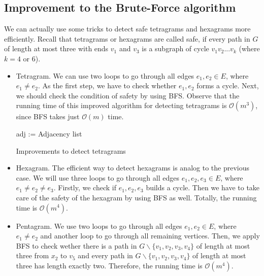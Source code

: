 \subsection{Improvement to the Brute-Force algorithm}
We can actually use some tricks to detect safe tetragrams and hexagrams more efficiently. Recall that tetragrams or hexagrams are called safe, if every path in $G$ of length at most three with ends $v_1$ and $v_3$ is a subgraph of cycle $v_1v_2...v_k$ (where $k = 4$ or $6$).
\begin{itemize}
    \item Tetragram. We can use two loops to go through all edges $e_1, e_2 \in E$, where $e_1 \ne e_2$. As the first step, we have to check whether $e_1, e_2$ forms a cycle. Next, we should check the condition of safety by using BFS. Observe that the running time of this improved algorithm for detecting tetragrams is $\mathcal{O}(m^3)$, since BFS takes just $\mathcal{O}(m)$ time.
    
    
    \begin{algorithm}[H]
    \DontPrintSemicolon
      adj := Adjacency list \\
        { 
        }
    \caption{Improvements to detect tetragrams}
    \end{algorithm}
    
    \item Hexagram. The efficient way to detect hexagrams is analog to the previous case. We will use three loops to go through all edges $e_1, e_2, e_3 \in E$, where $e_1 \ne e_2 \ne e_3$. Firstly, we check if $e_1, e_2, e_3$ builds a cycle. Then we have to take care of the safety of the hexagram by using BFS as well. Totally, the running time is $\mathcal{O}(m^4)$. 
    
    \item Pentagram. We use two loops to go through all edges $e_1, e_2 \in E$, where $e_1 \ne e_2$ and another loop to go through all remaining vertices. Then, we apply BFS to check wether there is a path in $G \backslash \{v_1, v_2, v_3, v_4\}$ of length at most three from $x_2$ to $v_5$ and every path in $G \backslash \{v_1, v_2, v_3, v_4\}$ of length at most three has length exactly two. Therefore, the running time is $\mathcal{O}(m^4)$.

\end{itemize}
